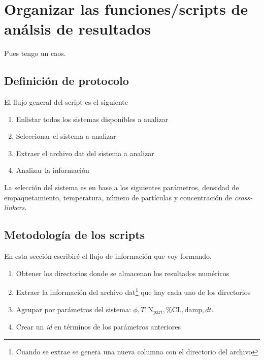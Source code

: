 \documentclass[../main.tex]{subfiles}
\begin{document}
\section{Organizar las funciones/scripts de análsis de resultados}

Pues tengo un caos.

\subsection{Definición de protocolo}

El flujo general del script es el siguiente

\begin{enumerate}
    \item Enlistar todos los sistemas disponibles a analizar
    \item Seleccionar el sistema a analizar
    \item Extraer el archivo dat del sistema a analizar
    \item Analizar la información
\end{enumerate}

La selección del sistema es en base a los siguientes parámetros, densidad de empaquetamiento, temperatura, número de partículas y concentración de \emph{cross-linkers}.

\subsection{Metodología de los scripts}

En esta sección escribiré el flujo de información que voy formando.

\begin{enumerate}
    \item Obtener los directorios donde se almacenan los resultados numéricos 
    \item Extraer la información del archivo dat\footnote{Cuando se extrae se genera una nueva columna con el directorio del archivo} que hay cada uno de los directorios
    \item Agrupar por parámetros del sistema: \(\phi,T,\mathrm{N}_{\mathrm{part}},\%\mathrm{CL},\mathrm{damp},dt\).
    \item Crear un \emph{id} en términos de los parámetros anteriores
\end{enumerate}
\end{document}
